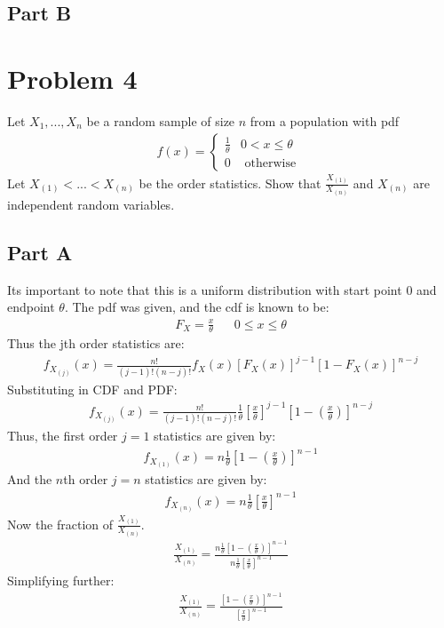 \documentclass{article}
\begin{document}

\subsection*{Part B}


\clearpage
\section*{Problem 4}
 Let $X_1,...,X_n$ be a random sample of size $n$ from a population with pdf
 \begin{align*}
 f(x) = \begin{cases} 
      \frac{1}{\theta} & 0<x\leq \theta \\
       0 & \text{ otherwise } 
   \end{cases}
\end{align*}
Let $X_{(1)}<...< X_{(n)}$ be the order statistics. Show that $\frac{X_{(1)}}{X_{(n)}}$ and $X_{(n)}$ are independent
random variables.
\subsection*{Part A}
Its important to note that this is a uniform distribution with start point $0$ and endpoint $\theta$.
The pdf was given, and the cdf is known to be:
\begin{align*}
F_X = \frac{x}{\theta} && 0 \leq x \leq \theta
\end{align*}
Thus the jth order statistics are:
\begin{align*}
f_{X_{(j)}}(x) = \frac{n!}{(j-1)!(n-j)!} f_X(x) [F_X(x)]^{j-1} [1-F_X(x)]^{n-j}
\end{align*}
Substituting in CDF and PDF:
\begin{align*}
f_{X_{(j)}}(x) = \frac{n!}{(j-1)!(n-j)!} \frac{1}{\theta} [\frac{x}{\theta}]^{j-1} [1-(\frac{x}{\theta})]^{n-j}
\end{align*}
Thus, the first order $j=1$ statistics are given by:
\begin{align*}
f_{X_{(1)}}(x) = n \frac{1}{\theta} [1-(\frac{x}{\theta})]^{n-1}
\end{align*}
And the $n$th order $j=n$ statistics are given by:
\begin{align*}
f_{X_{(n)}}(x) = n \frac{1}{\theta} [\frac{x}{\theta}]^{n-1}
\end{align*}
Now the fraction of $\frac{X_{(1)}}{X_{(n)}}$.
\begin{align*}
\frac{X_{(1)}}{X_{(n)}} = \frac{n \frac{1}{\theta} [1-(\frac{x}{\theta})]^{n-1}}{n \frac{1}{\theta} [\frac{x}{\theta}]^{n-1}}
\end{align*}
Simplifying further:
\begin{align*}
\frac{X_{(1)}}{X_{(n)}} = \frac{[1-(\frac{x}{\theta})]^{n-1}}{[\frac{x}{\theta}]^{n-1}}
\end{align*}
\end{document}
